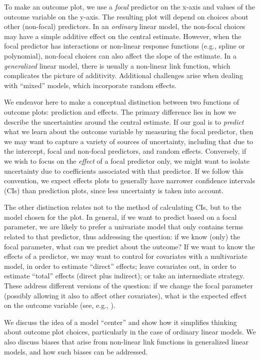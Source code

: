 To make an outcome plot, we use a \emph{focal} predictor on the x-axis and values of the outcome variable on the y-axis. The resulting plot will depend on choices about other (non-focal) predictors. In an \emph{ordinary} linear model, the non-focal choices may have a simple additive effect on the central estimate. However, when the focal predictor has interactions or non-linear response functions (e.g., spline or polynomial), non-focal choices can also affect the slope of the estimate. 
In a \emph{generalized} linear model, there is usually a non-linear link function, which complicates the picture of additivity.
Additional challenges arise when dealing with “mixed” models, which incorporate random effects.

We endeavor here to make a conceptual distinction between two functions of 
outcome plots: prediction and effects. 
The primary difference lies in how we describe the uncertainties around the central estimate. 
If our goal is to \emph{predict} what we learn about the outcome variable by measuring the focal predictor, then we may want to capture a variety of sources of uncertainty, including that due to the intercept, focal and non-focal predictors, and random effects.
Conversely, if we wish to focus on the \emph{effect} of a focal predictor only, we might want to isolate uncertainty due to coefficients associated with that predictor.
If we follow this convention, we expect effects plots to generally have narrower confidence intervals (CIs) than prediction plots, since less uncertainty is taken into account.

The other distinction relates not to the method of calculating CIs, but to the model chosen for the plot. 
In general, if we want to predict based on a focal parameter, we are likely to prefer a univariate model that only contains terms related to that predictor, thus addressing the question: if we know (only) the focal parameter, what can we predict about the outcome?
If we want to know the effects of a predictor, we may want to control for covariates with a multivariate model, in order to estimate “direct” effects; leave covariates out, in order to estimate “total” effects (direct plus indirect); or take an intermediate strategy.
These address different versions of the question: if we change the focal parameter (possibly allowing it also to affect other covariates), what is the expected effect on the outcome variable (see, e.g., \citep{shi_evidence_2017}).

We discuss the idea of a model “center” and show how it simplifies thinking about outcome plot choices, particularly in the case of ordinary linear models. We also discuss biases that arise from non-linear link functions in generalized linear models, and how such biases can be addressed.

